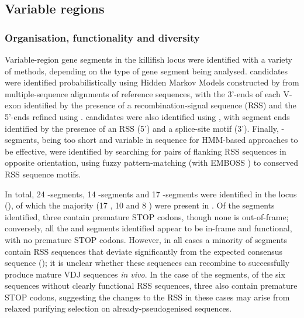 
\subsection{Variable regions}
\label{sec:nfu-locus-variable}
	
\subsubsection{Organisation, functionality and diversity}
\label{sec:nfu-locus-variable-orga}

Variable-region gene segments in the killifish \igh{} locus were identified with a variety of methods, depending on the type of gene segment being analysed. \vh candidates were identified probabilistically using Hidden Markov Models constructed by  from  multiple-sequence alignments of reference sequences, with the 3'-ends of each V-exon identified by the presence of a recombination-signal sequence (RSS) and the 5'-ends refined using . \jh candidates were also identified using , with segment ends identified by the presence of an RSS (5') and a  splice-site motif (3'). Finally, \dh-segments, being too short and variable in sequence for HMM-based approaches to be effective, were identified by searching for pairs of flanking RSS sequences in opposite orientation, using fuzzy pattern-matching (with EMBOSS ) to conserved RSS sequence motifs.
	 
In total, 24 \vh-segments, 14 \dh-segments and 17 \jh-segments were identified in the \Nfu locus (), of which the majority (17 \vh, 10 \dh and 8 \jh) were present in . Of the \vh segments identified, three contain premature STOP codons, though none is out-of-frame; conversely, all the \dh and \jh segments identified appear to be in-frame and functional, with no premature STOP codons. However, in all cases a minority of segments contain RSS sequences that deviate significantly from the expected consensus sequence (); it is unclear whether these sequences can recombine to successfully produce mature VDJ sequences \textit{in vivo}. In the case of the \vh segments, of the six sequences without clearly functional RSS sequences, three also contain premature STOP codons, suggesting the changes to the RSS in these cases may arise from relaxed purifying selection on already-pseudogenised sequences.
	
